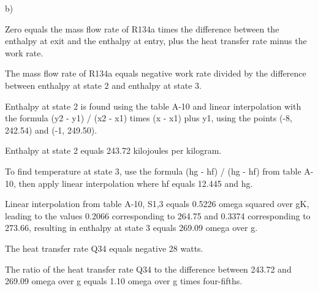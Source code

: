 b)

Zero equals the mass flow rate of R134a times the difference between the enthalpy at exit and the enthalpy at entry, plus the heat transfer rate minus the work rate.

The mass flow rate of R134a equals negative work rate divided by the difference between enthalpy at state 2 and enthalpy at state 3.

Enthalpy at state 2 is found using the table A-10 and linear interpolation with the formula (y2 - y1) / (x2 - x1) times (x - x1) plus y1, using the points (-8, 242.54) and (-1, 249.50).

Enthalpy at state 2 equals 243.72 kilojoules per kilogram.

To find temperature at state 3, use the formula (hg - hf) / (hg - hf) from table A-10, then apply linear interpolation where hf equals 12.445 and hg.

Linear interpolation from table A-10, S1,3 equals 0.5226 omega squared over gK, leading to the values 0.2066 corresponding to 264.75 and 0.3374 corresponding to 273.66, resulting in enthalpy at state 3 equals 269.09 omega over g.

The heat transfer rate Q34 equals negative 28 watts.

The ratio of the heat transfer rate Q34 to the difference between 243.72 and 269.09 omega over g equals 1.10 omega over g times four-fifths.